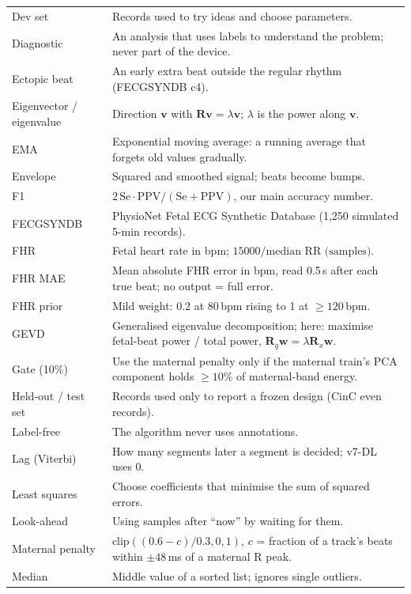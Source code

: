 \documentclass[11pt]{article}
\begin{document}
\begin{center}
\begin{longtable}{p{3.6cm}p{11.6cm}}
Dev set & Records used to try ideas and choose parameters. \\
Diagnostic & An analysis that uses labels to understand the problem; never part of the device. \\
Ectopic beat & An early extra beat outside the regular rhythm (FECGSYNDB c4). \\
Eigenvector / eigenvalue & Direction $\mathbf{v}$ with $\mathbf{R}\mathbf{v} = \lambda\mathbf{v}$; $\lambda$ is the power along $\mathbf{v}$. \\
EMA & Exponential moving average: a running average that forgets old values gradually. \\
Envelope & Squared and smoothed signal; beats become bumps. \\
F1 & $2\,\text{Se}\cdot\text{PPV}/(\text{Se}+\text{PPV})$, our main accuracy number. \\
FECGSYNDB & PhysioNet Fetal ECG Synthetic Database (1,250 simulated 5-min records). \\
FHR & Fetal heart rate in bpm; $15000/\text{median RR (samples)}$. \\
FHR MAE & Mean absolute FHR error in bpm, read 0.5\,s after each true beat; no output = full error. \\
FHR prior & Mild weight: 0.2 at 80\,bpm rising to 1 at $\ge 120$\,bpm. \\
GEVD & Generalised eigenvalue decomposition; here: maximise fetal-beat power / total power, $\mathbf{R}_q\mathbf{w} = \lambda\mathbf{R}_x\mathbf{w}$. \\
Gate (10\%) & Use the maternal penalty only if the maternal train's PCA component holds $\ge 10\%$ of maternal-band energy. \\
Held-out / test set & Records used only to report a frozen design (CinC even records). \\
Label-free & The algorithm never uses annotations. \\
Lag (Viterbi) & How many segments later a segment is decided; v7-DL uses 0. \\
Least squares & Choose coefficients that minimise the sum of squared errors. \\
Look-ahead & Using samples after ``now'' by waiting for them. \\
Maternal penalty & $\text{clip}((0.6-c)/0.3, 0, 1)$, $c$ = fraction of a track's beats within $\pm 48$\,ms of a maternal R peak. \\
Median & Middle value of a sorted list; ignores single outliers. \\

\end{longtable}
\end{center}
\end{document}
